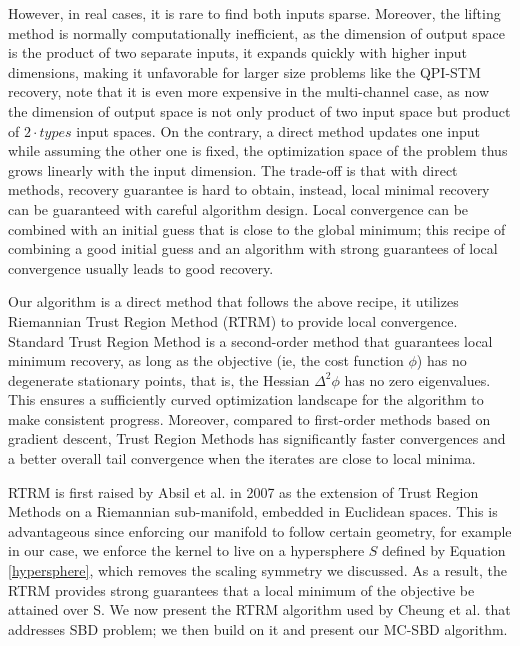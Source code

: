 However, in real cases, it is rare to find both inputs sparse. Moreover, the lifting method is normally computationally inefficient, as the dimension of output space is the product of two separate inputs, it expands quickly with higher input dimensions, making it unfavorable for larger size problems like the QPI-STM recovery, note that it is even more expensive in the multi-channel case, as now the dimension of output space is not only product of two input space but product of $2 \cdot types$ input spaces. On the contrary, a direct method updates one input while assuming the other one is fixed, the optimization space of the problem thus grows linearly with the input dimension. The trade-off is that with direct methods, recovery guarantee is hard to obtain, instead, local minimal recovery can be guaranteed with careful algorithm design. Local convergence can be combined with an initial guess that is close to the global minimum; this recipe of combining a good initial guess and an algorithm with strong guarantees of local convergence usually leads to good recovery. 

Our algorithm is a direct method that follows the above recipe, it utilizes Riemannian Trust Region Method (RTRM) to provide local convergence. Standard Trust Region Method is a second-order method that guarantees local minimum recovery, as long as the objective (ie, the cost function $\phi$) has no degenerate stationary points, that is, the Hessian $\Delta^2\phi$ has no zero eigenvalues. This ensures a sufficiently curved optimization landscape for the algorithm to make consistent progress. Moreover, compared to first-order methods based on gradient descent, Trust Region Methods has significantly faster convergences and a better overall tail convergence when the iterates are close to local minima. 

\ac{RTRM} is first raised by Absil et al. in 2007 as the extension of Trust Region Methods on a Riemannian sub-manifold, embedded in Euclidean spaces. This is advantageous since enforcing our manifold to follow certain geometry, for example in our case, we enforce the kernel to live on a hypersphere $S$ defined by Equation \ref{hypersphere}, which removes the scaling symmetry we discussed. As a result, the \ac{RTRM} provides strong guarantees that a local minimum of the objective be attained over S. We now present the \ac{RTRM} algorithm used by Cheung et al. \cite{cheungDictionaryLearningFouriertransform2020} that addresses \ac{SBD} problem; we then build on it and present our \ac{MC-SBD} algorithm. 

